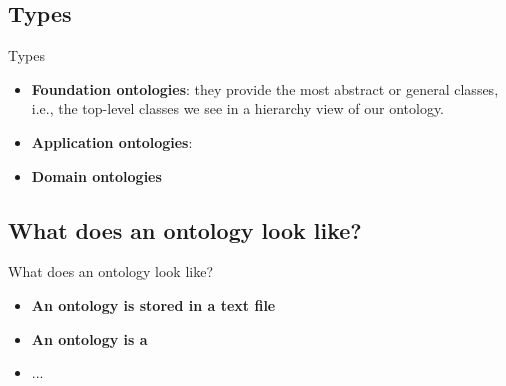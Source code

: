 \documentclass[english, xcolor=dvipsnames, aspectratio=169]{beamer}
\newcommand{\subsectiontitle}{}
\begin{document}
% 
\renewcommand{\subsectiontitle}{Types}
\subsection{\subsectiontitle}
\begin{frame}{\subsectiontitle}
    \begin{itemize}
        \item \textbf{Foundation ontologies}: they provide the most abstract or general classes, i.e., the top-level classes we see in a hierarchy view of our ontology.
        \item \textbf{Application ontologies}:
        \item \textbf{Domain ontologies}
    \end{itemize}
\end{frame}

% 
\renewcommand{\subsectiontitle}{What does an ontology look like?}
\subsection{\subsectiontitle}
\begin{frame}{\subsectiontitle}
    \begin{itemize}
        \item \textbf{An ontology is stored in a text file}
        \item \textbf{An ontology is a }
        \item ...
    \end{itemize}
\end{frame}


% 
\renewcommand{\subsectiontitle}{What does an ontology look like? (cont)}
\end{document}
